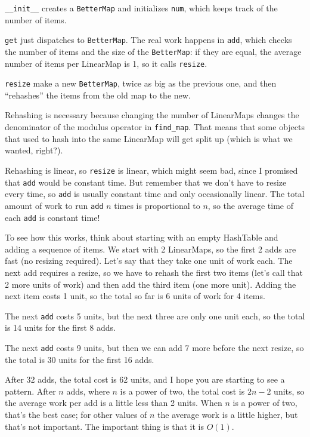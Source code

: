 \documentclass[10pt]{book}
\begin{document}
\verb"__init__" creates a {\tt BetterMap} and initializes {\tt num}, which keeps track of the number of items.

{\tt get} just dispatches to {\tt BetterMap}.  The real work happens
in {\tt add}, which checks the number of items and the size of the
{\tt BetterMap}: if they are equal, the average number of items per
LinearMap is 1, so it calls {\tt resize}.

{\tt resize} make a new {\tt BetterMap}, twice as big as the previous
one, and then ``rehashes'' the items from the old map to the new.

Rehashing is necessary because changing the number of LinearMaps
changes the denominator of the modulus operator in
\verb"find_map".  That means that some objects that used
to hash into the same LinearMap will get split up (which is
what we wanted, right?).

Rehashing is linear, so
{\tt resize} is linear, which might seem bad, since I promised
that {\tt add} would be constant time.  But remember that
we don't have to resize every time, so {\tt add} is usually
constant time and only occasionally linear.  The total amount
of work to run {\tt add} $n$ times is proportional to $n$,
so the average time of each {\tt add} is constant time!

To see how this works, think about starting with an empty
HashTable and adding a sequence of items.  We start with 2 LinearMaps,
so the first 2 adds are fast (no resizing required).  Let's
say that they take one unit of work each.  The next add
requires a resize, so we have to rehash the first two
items (let's call that 2 more units of work) and then
add the third item (one more unit).  Adding the next item
costs 1 unit, so the total so far is
6 units of work for 4 items.

The next {\tt add} costs 5 units, but the next three
are only one unit each, so the total is 14 units for the
first 8 adds.

The next {\tt add} costs 9 units, but then we can add 7 more
before the next resize, so the total is 30 units for the
first 16 adds.

After 32 adds, the total cost is 62 units, and I hope you are starting
to see a pattern.  After $n$ adds, where $n$ is a power of two, the
total cost is $2n-2$ units, so the average work per add is
a little less than 2 units.  When $n$ is a power of two, that's
the best case; for other values of $n$ the average work is a little
higher, but that's not important.  The important thing is that it
is $O(1)$.
\end{document}
